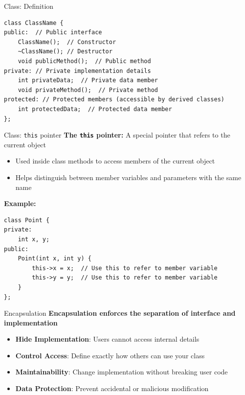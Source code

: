 \begin{frame}[fragile]{Class: Definition}
    \begin{verbatim}
class ClassName {
public:  // Public interface
    ClassName();  // Constructor
    ~ClassName(); // Destructor
    void publicMethod();  // Public method
private: // Private implementation details
    int privateData;  // Private data member
    void privateMethod();  // Private method
protected: // Protected members (accessible by derived classes)
    int protectedData;  // Protected data member
};
    \end{verbatim}
\end{frame}


\begin{frame}[fragile]{Class: \texttt{this} pointer}
    \textbf{The \texttt{this} pointer:} A special pointer that refers to the current object

    \begin{itemize}
        \item Used inside class methods to access members of the current object
        \item Helps distinguish between member variables and parameters with the same name
    \end{itemize}

    \textbf{Example:}
    \begin{verbatim}
class Point {
private:
    int x, y;
public:
    Point(int x, int y) {
        this->x = x;  // Use this to refer to member variable
        this->y = y;  // Use this to refer to member variable
    }
};
    \end{verbatim}
\end{frame}


\begin{frame}[fragile]{Encapsulation}
	\textbf{Encapsulation enforces the separation of interface and implementation}
	\begin{itemize}
		\item \textbf{Hide Implementation}: Users cannot access internal details
		\item \textbf{Control Access}: Define exactly how others can use your class
		\item \textbf{Maintainability}: Change implementation without breaking user code
		\item \textbf{Data Protection}: Prevent accidental or malicious modification
	\end{itemize}

\end{frame}

